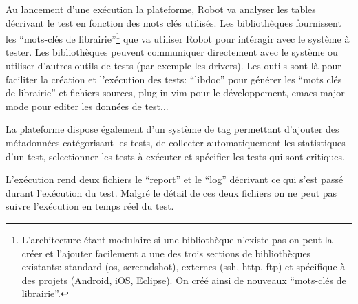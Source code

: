 Au lancement d'une exécution la plateforme, Robot va analyser les tables décrivant le test en fonction des mots clés utilisés. Les bibliothèques fournissent les ``mots-clés de librairie''\footnote{L'architecture étant modulaire si une bibliothèque n'existe pas on peut la créer et l'ajouter facilement a une des trois sections de bibliothèques existants: standard (os, screendshot), externes (ssh, http, ftp) et spécifique à des projets (Android, iOS, Eclipse). On créé ainsi de nouveaux ``mots-clés de librairie''.} que va utiliser Robot pour intéragir avec le système à tester. Les bibliothèques peuvent communiquer directement avec le système ou utiliser d'autres outils de tests (par exemple les drivers). Les outils sont là pour faciliter la création et l'exécution des tests: ``libdoc'' pour générer les ``mots clés de librairie'' et fichiers sources, plug-in vim pour le développement, emacs major mode pour editer les données de test... 

La plateforme dispose également d'un système de tag permettant d'ajouter des métadonnées catégorisant les tests, de collecter automatiquement les statistiques d'un test, selectionner les tests à exécuter et spécifier les tests qui sont critiques. 

L'exécution rend deux fichiers le ``report'' et le ``log'' décrivant ce qui s'est passé durant l'exécution du test. Malgré le détail de ces deux fichiers on ne peut pas suivre l'exécution en temps réel du test.

